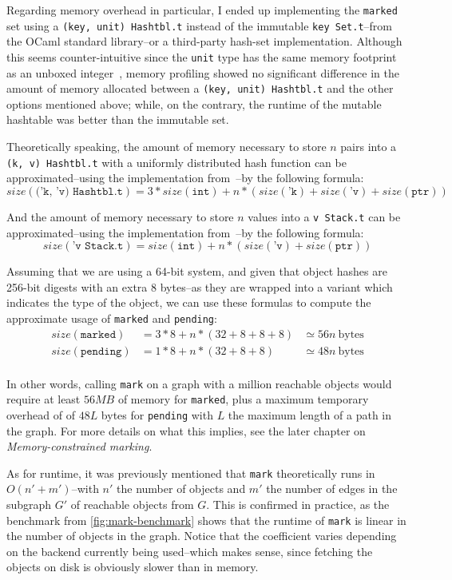 Regarding memory overhead in particular, I ended up implementing the \texttt{marked} set using a \texttt{(key,\ unit)\ Hashtbl.t} instead of the immutable \texttt{key\ Set.t}--from the OCaml standard library--or a third-party hash-set implementation. Although this seems counter-intuitive since the \texttt{unit} type has the same memory footprint as an unboxed integer~\cite{ocaml-layout}, memory profiling showed no significant difference in the amount of memory allocated between a \texttt{(key,\ unit)\
  Hashtbl.t} and the other options mentioned above; while, on the contrary, the runtime of the mutable hashtable was better than the immutable set.


\bigskip
Theoretically speaking, the amount of memory necessary to store \(n\) pairs into a \texttt{(\textquotesingle{}k,\ \textquotesingle{}v)\ Hashtbl.t} with a uniformly distributed hash function can be approximated--using the implementation from~\cite{impl-hashtbl}--by the following formula: \[
  size(\texttt{('k, 'v) Hashtbl.t}) = 3 * size(\texttt{int}) + n * (size(\texttt{'k}) + size(\texttt{'v}) + size(\texttt{ptr}))
\]

And the amount of memory necessary to store \(n\) values into a \texttt{\textquotesingle{}v\ Stack.t} can be approximated--using the implementation from~\cite{impl-stack}--by the following formula: \[
  size(\texttt{'v Stack.t}) = size(\texttt{int}) + n * (size(\texttt{'v}) + size(\texttt{ptr}))
\]

Assuming that we are using a 64-bit system, and given that object hashes are 256-bit digests with an extra 8 bytes--as they are wrapped into a variant which indicates the type of the object, we can use these formulas to compute the approximate usage of \texttt{marked} and \texttt{pending}: \[
  \begin{array}{lll}
    size(\texttt{marked})  & = 3*8 + n * (32 + 8 + 8 + 8) & \simeq 56 n \
    \text{bytes}
    \\
    size(\texttt{pending}) & = 1*8 + n * (32 + 8 + 8)     & \simeq 48 n \
    \text{bytes}
    \\
  \end{array}
\]

\bigskip
In other words, calling \texttt{mark} on a graph with a million reachable objects would require at least \(56 MB\) of memory for \texttt{marked}, plus a maximum temporary overhead of of \(48L\) bytes for \texttt{pending} with \(L\) the maximum length of a path in the graph. For more details on what this implies, see the later chapter on \emph{Memory-constrained marking}.

As for runtime, it was previously mentioned that \texttt{mark} theoretically runs in \(O(n' + m')\)--with \(n'\) the number of objects and \(m'\) the number of edges in the subgraph \(G'\) of reachable objects from \(G\). This is confirmed in practice, as the benchmark from \cref{fig:mark-benchmark} shows that the runtime of \texttt{mark} is linear in the number of objects in the graph. Notice that the coefficient varies depending on the backend currently being used--which makes sense, since fetching the objects on disk is obviously slower than in memory.


